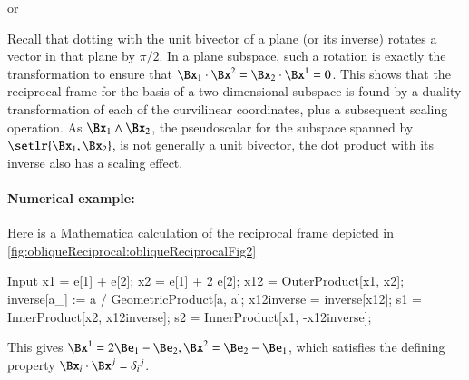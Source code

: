 or


Recall that dotting with the unit bivector of a plane (or its inverse) rotates a vector in that plane by \( \pi/2 \).
In a plane subspace, such a rotation is exactly the transformation to ensure that \( \Bx_1 \cdot \Bx^2 = \Bx_2 \cdot \Bx^1 = 0 \).
This shows that the reciprocal frame for the basis of a two dimensional subspace is found by a duality transformation of each of the curvilinear coordinates, plus a subsequent scaling operation.
As \( \Bx_1 \wedge \Bx_2 \), the pseudoscalar for the subspace spanned by \( \setlr{ \Bx_1, \Bx_2 } \), is not generally a unit bivector, the dot product with its inverse also has a scaling effect.

\paragraph{Numerical example:}
Here is a Mathematica calculation of the reciprocal frame depicted in \cref{fig:obliqueReciprocal:obliqueReciprocalFig2} 

\begin{mmaCell}[moredefined={x1, e, x2, x12, OuterProduct, inverse, GeometricProduct, x12inverse, s1, InnerProduct, s2},morepattern={a_,a}]{Input}
x1 = e[1] + e[2]; x2 = e[1] + 2 e[2];
x12 = OuterProduct[x1, x2];
inverse[a_] := a / GeometricProduct[a, a];
x12inverse = inverse[x12];
s1 = InnerProduct[x2, x12inverse];
s2 = InnerProduct[x1, -x12inverse];
\end{mmaCell}

This gives \( \Bx^1 = 2 \Be_1 - \Be_2, \Bx^2 = \Be_2 - \Be_1 \), which 
satisfies the defining property
\( \Bx_i \cdot \Bx^j = {\delta_i}^j \).


